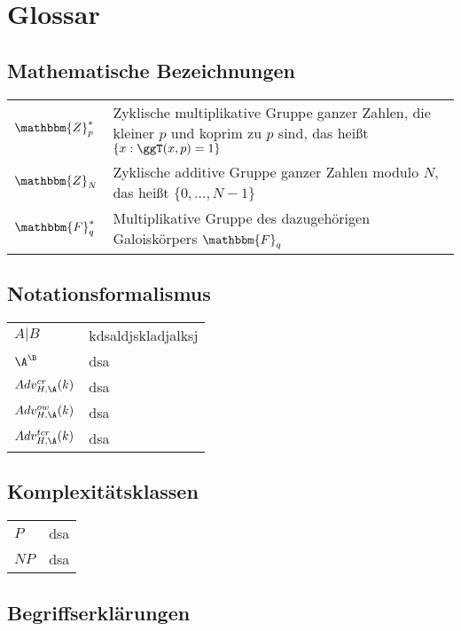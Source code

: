\chapter{Glossar}
\section{Mathematische Bezeichnungen}

\setlength{\tabcolsep}{12pt}
\def\arraystretch{1.5}%
\begin{tabular}{l|l}
	$\mathbbm{Z}^{\ast}_p$ & Zyklische multiplikative Gruppe ganzer Zahlen, die kleiner $p$ und koprim zu $p$ sind, das heißt $\{x : \ggT(x, p) = 1\}$\\
	$\mathbbm{Z}_N$ & Zyklische additive Gruppe ganzer Zahlen modulo $N$, das heißt $\{0, \dots, N-1\}$\\
	$\mathbbm{F}^{\ast}_q$ & Multiplikative Gruppe des dazugehörigen Galoiskörpers $\mathbbm{F}_q$
\end{tabular}

\section{Notationsformalismus}
\begin{tabular}{l|l}
	$A \vert B$ & kdsaldjskladjalksj\\
	$\A^{\B}$ &dsa\\
	$Adv^{cr}_{H,\A}(k)$ & dsa \\
	$Adv^{ow}_{H,\A}(k)$ & dsa \\
	$Adv^{tcr}_{H,\A}(k)$ & dsa
\end{tabular}

\section{Komplexitätsklassen}
\begin{tabular}{l|l}
	$P$ & dsa \\
	$NP$ & dsa
\end{tabular}

\section{Begriffserklärungen}

